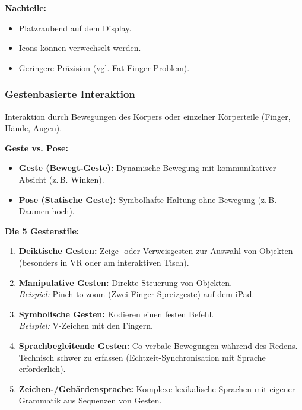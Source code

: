 \documentclass[12pt, a4paper]{article}
\begin{document}
\textbf{Nachteile:}
\begin{itemize}
  \item Platzraubend auf dem Display.
  \item Icons können verwechselt werden.
  \item Geringere Präzision (vgl. \glqq{}Fat Finger Problem\grqq{}).
\end{itemize}

\subsubsection{Gestenbasierte Interaktion}

Interaktion durch Bewegungen des Körpers oder einzelner Körperteile (Finger, Hände,
Augen).

\textbf{Geste vs. Pose:}
\begin{itemize}
  \item \textbf{Geste (Bewegt-Geste):} Dynamische Bewegung mit kommunikativer
        Absicht (z.\,B. Winken).
  \item \textbf{Pose (Statische Geste):} Symbolhafte Haltung ohne Bewegung
        (z.\,B. \glqq{}Daumen hoch\grqq{}).
\end{itemize}

\textbf{Die 5 Gestenstile:}
\begin{enumerate}
  \item \textbf{Deiktische Gesten:} Zeige- oder Verweisgesten zur Auswahl von
        Objekten (besonders in VR oder am interaktiven Tisch).
  \item \textbf{Manipulative Gesten:} Direkte Steuerung von Objekten.\\
        \textit{Beispiel:} Pinch-to-zoom (Zwei-Finger-Spreizgeste) auf dem iPad.
  \item \textbf{Symbolische Gesten:} Kodieren einen festen Befehl.\\
        \textit{Beispiel:} \glqq{}V\grqq{}-Zeichen mit den Fingern.
  \item \textbf{Sprachbegleitende Gesten:} Co-verbale Bewegungen während des
        Redens. Technisch schwer zu erfassen (Echtzeit-Synchronisation mit Sprache
        erforderlich).
  \item \textbf{Zeichen-/Gebärdensprache:} Komplexe lexikalische Sprachen mit
        eigener Grammatik aus Sequenzen von Gesten.
\end{enumerate}
\end{document}
